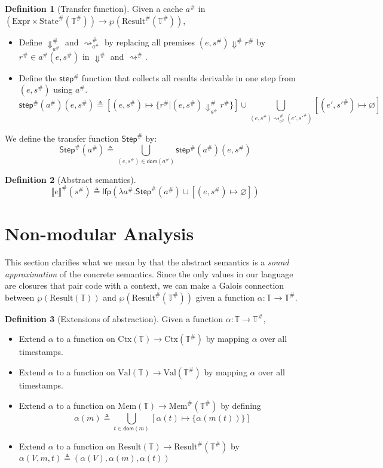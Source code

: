 \documentclass[acmsmall,review]{acmart}\settopmatter{printfolios=true,printccs=false,printacmref=false}
\theoremstyle{definition}
\newtheorem{definition}{Definition}[section]
\newcommand*{\A}[1]{{#1}^{\#}}
\newcommand*{\Expr}{\text{Expr}}
\newcommand*{\Time}{\mathbb{T}}
\newcommand*{\ATime}{\A{\Time}}
\newcommand*{\Ctx}[1]{\text{Ctx}({#1})}
\newcommand*{\Value}[1]{\text{Val}({#1})}
\newcommand*{\Mem}[1]{\text{Mem}({#1})}
\newcommand*{\mem}{m}
\newcommand*{\AMem}[1]{\A{\text{Mem}}({#1})}
\newcommand*{\AState}[1]{\A{\text{State}}({#1})}
\newcommand*{\Result}[1]{\text{Result}({#1})}
\newcommand*{\AResult}[1]{\A{\text{Result}}({#1})}
\newcommand*{\sembracket}[1]{\lBrack{#1}\rBrack}
\begin{document}
\begin{definition}[Transfer function]
  Given a cache $\A{a}$ in $(\Expr\times\AState{\ATime})\rightarrow{\wp(\AResult{\ATime})}$,

  \begin{itemize}
    \item Define $\A{\Downarrow}_{\A{a}}$ and $\A{\rightsquigarrow}_{\A{a}}$ by replacing all premises $(e,\A{s})\A\Downarrow\A{r}$ by $\A{r}\in\A{a}(e,\A{s})$ in $\A\Downarrow$ and $\A\rightsquigarrow$.
    \item Define the $\A{\mathsf{step}}$ function that collects all results derivable in one step from $(e,\A{s})$ using $\A{a}$.
          \[
            \A{\mathsf{step}}(\A{a})(e,\A{s})\triangleq
            [(e,\A{s})\mapsto\{\A{r}|(e,\A{s})\A{\Downarrow}_{\A{a}}\A{r}\}]
            \cup
            \bigcup_{(e,\A{s})\A{\rightsquigarrow}_{\A{a}}(e',\A{s'})}[(e',\A{s'})\mapsto\varnothing]
          \]
  \end{itemize}

  We define the transfer function $\A{\mathsf{Step}}$ by:
  \[
    \A{\mathsf{Step}}(\A{a})\triangleq
    \bigcup_{(e,\A{s})\in\mathsf{dom}(\A{a})}
    {\A{\mathsf{step}}(\A{a})(e,\A{s})}
  \]
\end{definition}

\begin{definition}[Abstract semantics]
  \[
    \A{\sembracket{e}}(\A{s})\triangleq\mathsf{lfp}(\lambda \A{a}.\A{\mathsf{Step}}(\A{a})\cup[(e,\A{s})\mapsto\varnothing])
  \]
\end{definition}

\section{Non-modular Analysis}
This section clarifies what we mean by that the abstract semantics is a \emph{sound approximation} of the concrete semantics.
Since the only values in our language are closures that pair code with a context, we can make a Galois connection between $\wp(\Result{\Time})$ and $\wp(\AResult{\ATime})$ given a function $\alpha:\Time\rightarrow\ATime$.

\begin{definition}[Extensions of abstraction]
  Given a function $\alpha:\Time\rightarrow\ATime$,
  \begin{itemize}
    \item Extend $\alpha$ to a function on $\Ctx{\Time}\rightarrow\Ctx{\ATime}$ by mapping $\alpha$ over all timestamps.
    \item Extend $\alpha$ to a function on $\Value{\Time}\rightarrow\Value{\ATime}$ by mapping $\alpha$ over all timestamps.
    \item Extend $\alpha$ to a function on $\Mem{\Time}\rightarrow\AMem{\ATime}$ by defining
          \[\alpha(\mem)\triangleq\bigcup_{t\in\mathsf{dom}(\mem)}[\alpha(t)\mapsto\{\alpha(\mem(t))\}]\]
    \item Extend $\alpha$ to a function on $\Result{\Time}\rightarrow\AResult{\ATime}$ by $\alpha(V,\mem,t)\triangleq(\alpha(V),\alpha(\mem),\alpha(t))$
  \end{itemize}
\end{definition}
\end{document}
